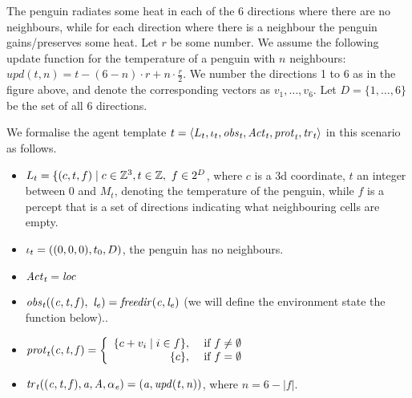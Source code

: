 \begin{example}
  The penguin radiates some heat in each of the 6 directions where there are no
  neighbours, while for each direction where there is a neighbour the penguin
  gains/preserves some heat. Let $r$ be some number. We assume the following
  update function for the temperature of a penguin with $n$ neighbours:
  $\mathit{upd}(t,n) = t - (6-n)\cdot r + n\cdot\frac{r}{2}$.
  We number the directions 1 to 6 as in the figure
  above, and denote the corresponding vectors as $v_1,\dots,v_6$. Let
  $D = \{1,\dots,6\}$ be the set of all 6 directions.


  We formalise the agent template
  ${t} = \left \langle L_{t}, \iota_{t}, \it{obs}_{t}, \it{Act}_{t}, \it{prot}_{t}, \it{tr}_{t}  \right \rangle$
  in this scenario as follows.

 
  \begin{itemize}[$\bullet$]
  \item
    $L_{t} = \{(c,t,f) \mid c \in \mathbb{Z}^3, t \in \mathbb{Z}, \ f \in
    2^D$, where $c$ is a 3d coordinate, $t$ an integer between 0 and $M_t$,
    denoting the temperature of the penguin, while $f$ is a percept that is a
    set of directions indicating what neighbouring cells are empty.

  \item $\iota_{t} = ((0,0,0),t_0, D)$, the penguin has no neighbours.
    
  \item $\it{Act}_{t} = \mathit{loc}$ %

  \item $\it{obs}_{t}((c,t,f), \ l_{e}) = freedir(c,l_{e})$ (we will
    define the environment state the function below)..
    
    
  \item $\it{prot}_{t}(c,t,f) = \left\{
      \begin{array}{rl}
        \{c + v_i \mid i \in f\}, & \text{ if } f \neq \emptyset\\ 
        \{c\}, & \text{ if } f = \emptyset\\ 
      \end{array} \right.$

    
  \item $\it{tr}_{t}((c,t, f), a, A, \it{\alpha}_{e}) = (a, \mathit{upd}(t,n))$, where
    $n = 6 - |f|$.
  \end{itemize}

\end{example}



